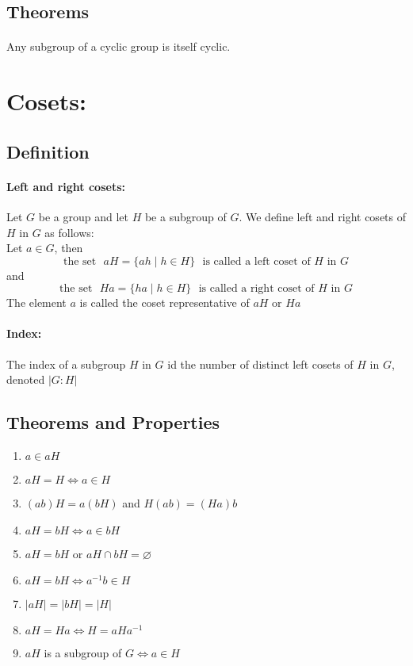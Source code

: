 \documentclass[11pt, letterpaper]{article}
\newcommand{\ord}[1]{\lvert{#1}\rvert}
\newcommand{\inv}{^{-1}}
\begin{document}
	\subsection{Theorems}
		\paragraph{}
			Any subgroup of a cyclic group is itself cyclic.

\section{Cosets:}
	\subsection{Definition}
		\paragraph{Left and right cosets:}
			Let $G$ be a group and let $H$ be a subgroup of $G$.
			We define left and right cosets of $H$ in $G$ as follows: \\
			Let $a \in G$, then 
			\[ \text{the set ~} aH = \{ ah \mid h \in H \} \text{ ~is called a left coset of $H$ in $G$} \]
			and
			\[ \text{the set ~} Ha = \{ ha \mid h \in H \} \text{ ~is called a right coset of $H$ in $G$} \]
			The element $a$ is called the coset representative of $aH$ or $Ha$

		\paragraph{Index:}
			The index of a subgroup $H$ in $G$ id the number of distinct left cosets of $H$ in $G$, denoted $\ord{G:H}$

	\subsection{Theorems and Properties}

		\begin{enumerate}
			\item $a \in aH$ 
			\item $aH = H \iff a \in H $
			\item $(ab)H = a(bH)$ and $ H(ab) = (Ha)b $
			\item $aH = bH \iff a \in bH$
			\item $ aH = bH $ or $ aH \cap bH = \varnothing $
			\item $ aH = bH \iff a\inv b \in H $
			\item $ \ord{aH} = \ord{bH} = \ord{H} $
			\item $ aH = Ha \iff H = aHa\inv $
			\item $aH$ is a subgroup of $G \iff a \in H$
		\end{enumerate}
\end{document}
